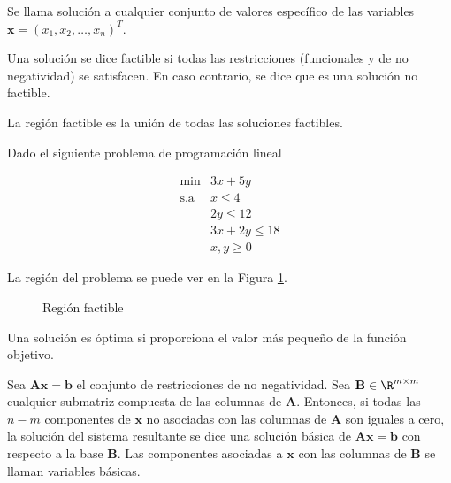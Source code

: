 \begin{defi}
Se llama solución a cualquier conjunto de valores específico de las variables $\mathbf{x} = (x_1, x_2, \dots, x_n)^T$.
\end{defi}

\begin{defi}
Una solución se dice factible si todas las restricciones (funcionales y de no negatividad) se satisfacen. En caso contrario, se dice que es una solución no factible.
\end{defi}

\begin{defi}
La región factible es la unión de todas las soluciones factibles.
\end{defi}

\begin{ejemplo}
Dado el siguiente problema de programación lineal

\begin{equation}
\begin{array}{rl}
\mathrm{min} & 3x + 5y\\
\mathrm{s.a} & x \leq 4\\
			 & 2y \leq 12\\
			 & 3x + 2y \leq 18\\
			 & x, y \geq 0 
\end{array} 
\end{equation}

La región del problema se puede ver en la Figura \ref{fig:ejemplo_region_factible}.

\begin{figure}[htb]
\centering
\ejemploregionfactible
\caption{Región factible}
\label{fig:ejemplo_region_factible}
\end{figure}
\end{ejemplo}

\begin{defi}
Una solución es óptima si proporciona el valor más pequeño de la función objetivo.
\end{defi}

\begin{defi}
Sea $\mathbf{A x} = \mathbf{b}$ el conjunto de restricciones de no negatividad. Sea $\mathbf{B} \in \R^{m \times m}$ cualquier submatriz compuesta de las columnas de $\mathbf{A}$. Entonces, si todas las $n-m$ componentes de $\mathbf{x}$ no asociadas con las columnas de $\mathbf{A}$ son iguales a cero, la solución del sistema resultante se dice una solución básica de $\mathbf{A x} = \mathbf{b}$ con respecto a la base $\mathbf{B}$. Las componentes asociadas a $\mathbf{x}$ con las columnas de $\mathbf{B}$ se llaman variables básicas.
\end{defi}


